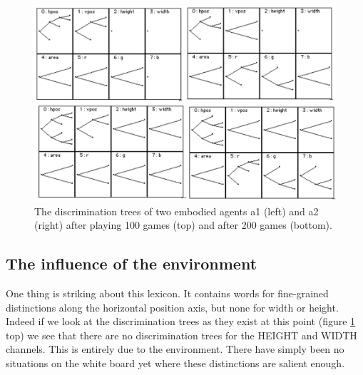 \begin{figure}[htbp]
  \centerline{\includegraphics[width=.75\textwidth]{chap7/figs/discri200}}
\caption{ \label{discri200} The discrimination trees 
of two embodied agents {\bfshape a1} (left) and {\bfshape a2} (right) 
after playing 100 games (top) and after 200 games (bottom).}
\end{figure}

\subsection{The influence of the environment}

One thing is striking about this lexicon. It contains
words for fine-grained distinctions along the 
horizontal position axis, but none for width or 
height. Indeed if we look at the discrimination
trees as they exist at this point (figure 
\ref{discri200} top) we see that there are no 
discrimination trees for the HEIGHT and WIDTH
channels. This is entirely due to the 
environment. There have simply been no situations on 
the white board yet where these distinctions are salient 
enough. 

